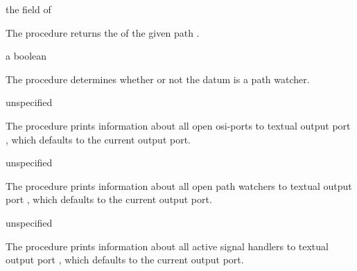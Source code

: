 \begin{procedure}
\end{procedure}
\returns{} the  field of 

The  procedure returns the  of the
given path .

\begin{procedure}
\end{procedure}
\returns{} a boolean

The  procedure determines whether or not the datum
 is a path watcher.

\begin{procedure}
\end{procedure}
\returns{} unspecified

The  procedure prints information about all open
osi-ports to textual output port , which defaults to the
current output port.

\begin{procedure}
\end{procedure}
\returns{} unspecified

The  procedure prints information about all
open path watchers to textual output port
, which defaults to the current output port.

\begin{procedure}
\end{procedure}
\returns{} unspecified

The  procedure prints information about all
active signal handlers to textual output port
, which defaults to the current output port.

